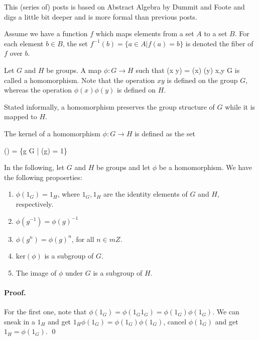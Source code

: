 
This (series of) posts is based on Abstract Algebra by Dummit and Foote and digs a little bit deeper and is more formal than previous posts.

\begin{definition}[Fibers]
Assume we have a function $f$ which maps elements from a set $A$ to a set $B$. For each element $b \in B$, the set $f^{-1}(b) = \{a \in A | f(a) = b\}$ is denoted the fiber of $f$ over $b$.
\end{definition}


\begin{definition}[Homomorphism]
Let $G$ and $H$ be groups. A map $\phi: G \rightarrow H$ such that
\bee
\phi(x y) = \phi(x) \phi(y) \quad \forall x,y \in G
\eee
is called a homomorphism. Note that the operation $xy$ is defined on the group $G$, whereas the operation $\phi(x) \phi(y)$ is defined on $H$.
\end{definition}

Stated informally, a homomorphism preserves the group structure of $G$ while it is mapped to $H$.

\begin{definition}[Kernel]
The kernel of a homomorphism $\phi: G \rightarrow H$ is defined as the set

\bee
{}(\phi) = \{g \in G | \phi(g) = 1\}
\eee
\end{definition}

In the following, let $G$ and $H$ be groups and let $\phi$ be a homomorphism. We have the following propoerties:

\begin{enumerate}

\item $\phi(1_G) = 1_H$, where $1_G, 1_H$ are the identity elements of $G$ and $H$, respectively.

\item $\phi(g^{-1}) = \phi(g)^{-1}$

\item $\phi(g^n) = \phi(g)^n$, for all $n \in mZ$.

\item $\text{ker}(\phi)$ is a subgroup of $G$.

\item The image of $\phi$ under $G$ is a subgroup of $H$.

\end{enumerate}

\paragraph{Proof.} For the first one, note that $\phi(1_G) =\phi(1_G 1_G) = \phi(1_G) \phi(1_G)$. We can sneak in a $1_H$ and get $1_H \phi(1_G) =  \phi(1_G) \phi(1_G)$, cancel $\phi(1_G)$ and get $1_H = \phi(1_G)$. \qed

